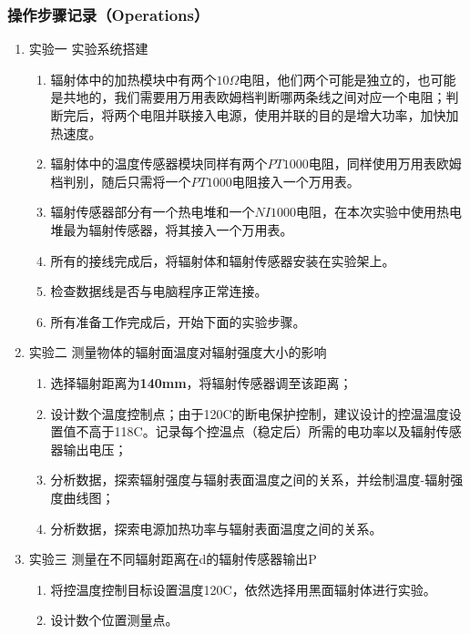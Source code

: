 \documentclass[dvipsnames, svgnames,a4paper,11pt]{article}
\begin{document}
	\subsubsection{操作步骤记录（Operations）}
	\begin{enumerate}
		\item 实验一 实验系统搭建
		\begin{enumerate}
			\item 辐射体中的加热模块中有两个$10\Omega$电阻，他们两个可能是独立的，也可能是共地的，我们需要用万用表欧姆档判断哪两条线之间对应一个电阻；判断完后，将两个电阻并联接入电源，使用并联的目的是增大功率，加快加热速度。
			\item 辐射体中的温度传感器模块同样有两个$PT1000$电阻，同样使用万用表欧姆档判别，随后只需将一个$PT1000$电阻接入一个万用表。
			\item 辐射传感器部分有一个热电堆和一个$NI1000$电阻，在本次实验中使用热电堆最为辐射传感器，将其接入一个万用表。
			\item 所有的接线完成后，将辐射体和辐射传感器安装在实验架上。
			\item 检查数据线是否与电脑程序正常连接。
			\item 所有准备工作完成后，开始下面的实验步骤。
		\end{enumerate}
		
		\item 实验二 测量物体的辐射面温度对辐射强度大小的影响
		\begin{enumerate}
			\item 选择辐射距离为\textbf{140mm}，将辐射传感器调至该距离；
			
			\item 设计数个温度控制点；由于120\degree C的断电保护控制，建议设计的控温温度设置值不高于118\textdegree C。记录每个控温点（稳定后）所需的电功率以及辐射传感器输出电压；
			
			\item 分析数据，探索辐射强度与辐射表面温度之间的关系，并绘制温度-辐射强度曲线图；
			
			\item 分析数据，探索电源加热功率与辐射表面温度之间的关系。
		\end{enumerate}
		
		\item 实验三 测量在不同辐射距离在d的辐射传感器输出P 
		\begin{enumerate}
			\item 将控温度控制目标设置温度120\degree C，依然选择用黑面辐射体进行实验。
			
			\item 设计数个位置测量点。
			

\end{enumerate}
\end{enumerate}
\end{document}
